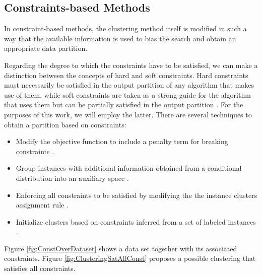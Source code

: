 \subsection{Constraints-based Methods}

In constraint-based methods, the clustering method itself is modified in such a way that the available information is used to bias the search and obtain an appropriate data partition.

Regarding the degree to which the constraints have to be satisfied, we can make a distinction between the concepts of hard \cite{wagstaff2001constrained}\cite{davidson2005agglomerative} and soft \cite{law2004clustering}\cite{basu2004active}\cite{segal2003discovering}\cite{davidson2005clustering}\cite{law2005model} constraints. Hard constraints must necessarily be satisfied in the output partition of any algorithm that makes use of them, while soft constraints are taken as a strong guide for the algorithm that uses them but can be partially satisfied in the output partition \cite{seret2014new}. For the purposes of this work, we will employ the latter. There are several techniques to obtain a partition based on constraints:

\begin{itemize}
	
	\item  Modify the objective function to include a penalty term for breaking constraints \cite{demiriz1999semi} \cite{davidson2005clustering}.
	
	\item Group instances with additional information obtained from a conditional distribution into an auxiliary space \cite{sinkkonen2000semisupervised}.
	
	\item Enforcing all constraints to be satisfied by modifying the the instance clusters assignment rule \cite{wagstaff2001constrained}.
	
	\item Initialize clusters based on constraints inferred from a set of labeled instances \cite{basu2002semi}.
	
\end{itemize}

Figure \ref{fig:ConstOverDataset} shows a data set together with its associated constraints. Figure \ref{fig:ClusteringSatAllConst} proposes a possible clustering that satisfies all constraints.

